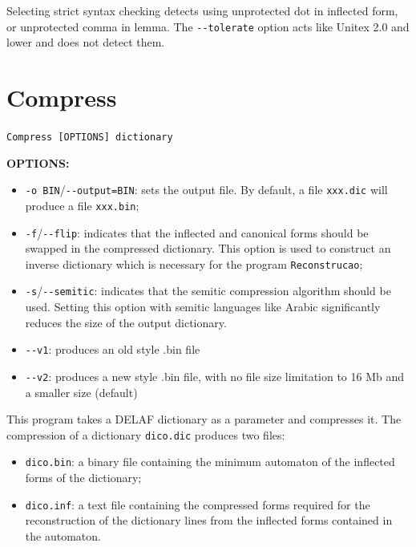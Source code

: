 \bigskip
\noindent Selecting strict syntax checking detects using unprotected dot in
inflected form, or unprotected comma in lemma. The \verb+--tolerate+ option acts like Unitex 2.0
and lower and does not detect them.





\section{Compress}
\label{section-compress}
\verb+Compress [OPTIONS] dictionary+

\bigskip
\noindent \textbf{OPTIONS:}
\begin{itemize}
  \item \verb+-o BIN+/\verb+--output=BIN+: sets the output file. By default, a file \verb+xxx.dic+ will
  produce a file \verb+xxx.bin+;
  \item \verb+-f+/\verb+--flip+: indicates
  that the inflected and canonical forms should be swapped in the compressed
  dictionary. This option is used to construct an inverse dictionary which is
  necessary for the program \verb+Reconstrucao+;
  \item \verb+-s+/\verb+--semitic+: indicates that the semitic compression algorithm should be used. Setting
  this option with semitic languages like Arabic significantly reduces the size of the output dictionary.
  \item \verb+--v1+: produces an old style .bin file
  \item \verb+--v2+: produces a new style .bin file, with no file size limitation to 16 Mb and 
  a smaller size (default)
\end{itemize}

\bigskip
\noindent This program takes a DELAF dictionary as a parameter and compresses it.
The compression of a dictionary \verb+dico.dic+ produces two files:
\begin{itemize}
  \item \verb+dico.bin+: a binary file containing the minimum automaton of the inflected forms of the dictionary;
  \item \verb+dico.inf+: a text file containing the compressed forms required for the reconstruction of the dictionary
  lines from the inflected forms contained in the automaton.
\end{itemize}

